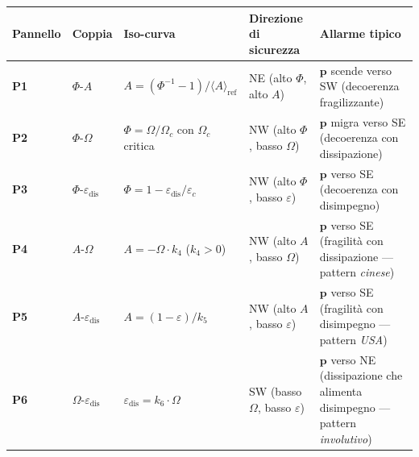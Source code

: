 {\def\LTcaptype{none} %
{\small\begin{longtable}[]{@{}
  >{\raggedright\arraybackslash}p{}
  >{\raggedright\arraybackslash}p{}
  >{\raggedright\arraybackslash}p{}
  >{\raggedright\arraybackslash}p{}
  >{\raggedright\arraybackslash}p{}@{}}
\toprule\noalign{}
\begin{minipage}[b]{\linewidth}\raggedright
Pannello
\end{minipage} & \begin{minipage}[b]{\linewidth}\raggedright
Coppia
\end{minipage} & \begin{minipage}[b]{\linewidth}\raggedright
Iso-curva
\end{minipage} & \begin{minipage}[b]{\linewidth}\raggedright
Direzione di sicurezza
\end{minipage} & \begin{minipage}[b]{\linewidth}\raggedright
Allarme tipico
\end{minipage} \\
\midrule\noalign{}
\endhead
\bottomrule\noalign{}
\endlastfoot
\textbf{P1} & \(\Phi\)-\(A\) &
\(A = (\Phi^{-1} - 1)/\langle A\rangle_{\text{ref}}\) & NE (alto
\(\Phi\), alto \(A\)) & \(\boldsymbol{p}\) scende verso SW (decoerenza
fragilizzante) \\
\textbf{P2} & \(\Phi\)-\(\Omega\) & \(\Phi = \Omega/\Omega_c\) con
\(\Omega_c\) critica & NW (alto \(\Phi\), basso \(\Omega\)) &
\(\boldsymbol{p}\) migra verso SE (decoerenza con dissipazione) \\
\textbf{P3} & \(\Phi\)-\(\varepsilon_{\text{dis}}\) &
\(\Phi = 1 - \varepsilon_{\text{dis}}/\varepsilon_c\) & NW (alto
\(\Phi\), basso \(\varepsilon\)) & \(\boldsymbol{p}\) verso SE
(decoerenza con disimpegno) \\
\textbf{P4} & \(A\)-\(\Omega\) & \(A = -\Omega \cdot k_4\) (\(k_4 > 0\))
& NW (alto \(A\), basso \(\Omega\)) & \(\boldsymbol{p}\) verso SE
(fragilità con dissipazione --- pattern \emph{cinese}) \\
\textbf{P5} & \(A\)-\(\varepsilon_{\text{dis}}\) &
\(A = (1 - \varepsilon)/k_5\) & NW (alto \(A\), basso \(\varepsilon\)) &
\(\boldsymbol{p}\) verso SE (fragilità con disimpegno --- pattern
\emph{USA}) \\
\textbf{P6} & \(\Omega\)-\(\varepsilon_{\text{dis}}\) &
\(\varepsilon_{\text{dis}} = k_6 \cdot \Omega\) & SW (basso \(\Omega\),
basso \(\varepsilon\)) & \(\boldsymbol{p}\) verso NE (dissipazione che
alimenta disimpegno --- pattern \emph{involutivo}) \\
\end{longtable}}
}

